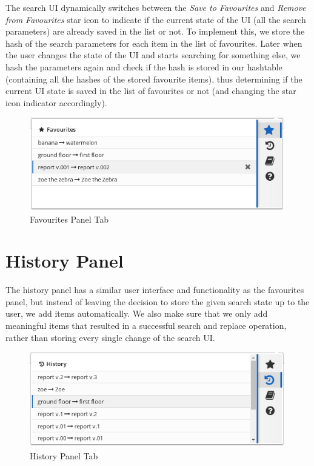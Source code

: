 \documentclass[bsc,frontabs,twoside,singlespacing,parskip,deptreport]{infthesis}
\begin{document}
The search UI dynamically switches between the \textit{Save to Favourites} and \textit{Remove from Favourites} star icon to indicate if the current state of the UI (all the search parameters) are already saved in the list or not. To implement this, we store the hash of the search parameters for each item in the list of favourites. Later when the user changes the state of the UI and starts searching for something else, we hash the parameters again and check if the hash is stored in our hashtable (containing all the hashes of the stored favourite items), thus determining if the current UI state is saved in the list of favourites or not (and changing the star icon indicator accordingly).

\begin{figure}[h]
\centering
\includegraphics[width=0.99\textwidth]{../main/images/help/fav-step-3.png}
\caption{Favourites Panel Tab}
\end{figure}

\section{History Panel}
The history panel has a similar user interface and functionality as the favourites panel, but instead of leaving the decision to store the given search state up to the user, we add items automatically. We also make sure that we only add meaningful items that resulted in a successful search and replace operation, rather than storing every single change of the search UI.

\begin{figure}[h]
\centering
\includegraphics[width=0.99\textwidth]{../main/images/help/history.png}
\caption{History Panel Tab}
\end{figure}
\end{document}
